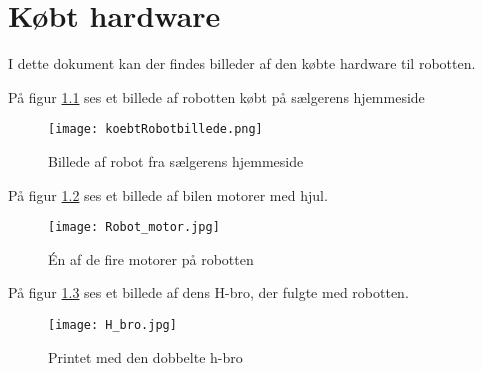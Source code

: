 %

%

\chapter{Købt hardware}
\label{appendix:BilagKoebtHardware}

I dette dokument kan der findes billeder af den købte hardware til robotten.

På figur \ref{fig:lkzjxf} ses et billede af robotten købt på sælgerens hjemmeside \cite{robot_bil}

\begin{figure}[H]
\centering
\texttt{[image: koebtRobotbillede.png]}
\caption{Billede af robot fra sælgerens hjemmeside}
\label{fig:lkzjxf}
\end{figure} 

På figur \ref{fig:Robot_motor} ses et billede af bilen motorer med hjul.

\begin{figure}[H]%
\centering
\texttt{[image: Robot\_motor.jpg]}
\caption{Én af de fire motorer på robotten}
\label{fig:Robot_motor}
\end{figure} 

På figur \ref{fig:Robot_hbro} ses et billede af dens H-bro, der fulgte med robotten.

\begin{figure}[H] %
\centering
\texttt{[image: H\_bro.jpg]}
\caption{Printet med den dobbelte h-bro}
\label{fig:Robot_hbro}
\end{figure}

%